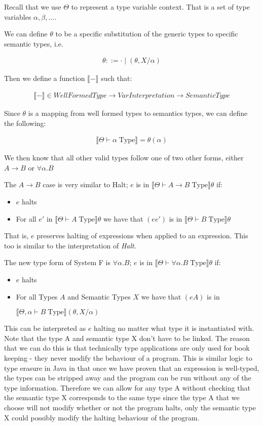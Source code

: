 \documentclass{article}
\newcommand{\inlineeq}[1]{
    \vspace{-2em}
    \begin{gather*}
    #1
    \end{gather*}
    \vspace{-2em}
}
\begin{document}
Recall that we use $\Theta$ to represent a type variable context. That is a set of type variables $\alpha, \beta, ...$.

We can define $\theta$ to be a specific substitution of the generic types to specific semantic types, i.e.

\inlineeq{\theta ::= \cdot \; | \; (\theta, X/\alpha)}

\newpage
Then we define a function $\llbracket - \rrbracket$ such that:

\inlineeq{\llbracket - \rrbracket \in WellFormedType \to VarInterpretation \to SemanticType}

Since $\theta$ is a mapping from well formed types to semantics types, we can define the following:

\inlineeq{\llbracket \Theta \vdash \alpha \; \textrm{Type} \rrbracket = \theta (\alpha)}

We then know that all other valid types follow one of two other forms, either $A \to B$ or $\forall \alpha . B$

The $A \to B$ case is very similar to Halt; $e$ is in $\llbracket \Theta \vdash A \to B \; \textrm{Type} \rrbracket \theta$ if:

\begin{itemize}
    \item $e$ halts
    \item For all $e'$ in $\llbracket \Theta \vdash A \; \textrm{Type} \rrbracket \theta$ we have that $(e e')$ is in $\llbracket \Theta \vdash B \; \textrm{Type} \rrbracket \theta$
\end{itemize}

That is, $e$ preserves halting of expressions when applied to an expression. This too is similar to the interpretation of \textit{Halt}.

The new type form of System F is $\forall \alpha . B$; $e$ is in $\llbracket \Theta \vdash \forall \alpha . B \; \textrm{Type} \rrbracket \theta$ if:

\begin{itemize}
    \item $e$ halts
    \item For all Types $A$ and Semantic Types $X$ we have that $(e A)$ is in
    
    $\llbracket \Theta, \alpha \vdash B \; \textrm{Type} \rrbracket (\theta, X/\alpha )$
\end{itemize}

This can be interpreted as $e$ halting no matter what type it is instantiated with. Note that the type A and semantic type X don't have to be linked. The reason that we can do this is that technically type applications are only used for book keeping - they never modify the behaviour of a program. This is similar logic to type erasure in Java in that once we have proven that an expression is well-typed, the types can be stripped away and the program can be run without any of the type information. Therefore we can allow for any type A without checking that the semantic type X corresponds to the same type since the type A that we choose will not modify whether or not the program halts, only the semantic type X could possibly modify the halting behaviour of the program.
\end{document}
